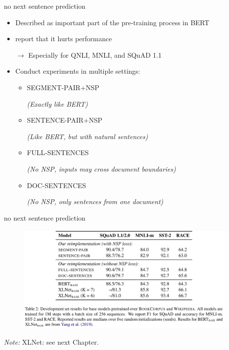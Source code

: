 
\begin{frame}{no next sentence prediction}

\vfill

	\begin{itemize}
		\item Described as important part of the pre-training process in BERT
		\item {} report that it hurts performance
		\item[$\to$] Especially for QNLI, MNLI, and SQuAD 1.1
		\item Conduct experiments in multiple settings: 
			\begin{itemize}
				\item SEGMENT-PAIR+NSP
				\item[] \textit{(Exactly like BERT)}
				\item SENTENCE-PAIR+NSP
				\item[] \textit{(Like BERT, but with natural sentences)}
				\item FULL-SENTENCES
				\item[] \textit{(No NSP, inputs may cross document boundaries)}
				\item DOC-SENTENCES
				\item[] \textit{(No NSP, only sentences from one document)}
			\end{itemize}
	\end{itemize}
	
\vfill

\end{frame}

\begin{frame}{no next sentence prediction}

\vfill

\begin{figure}
\centering
\includegraphics[width = 11cm]{figure/roberta-nsp.png}\\ 
\end{figure}

\vfill

\scriptsize
\textit{Note:} XLNet: see next Chapter.

\end{frame}

